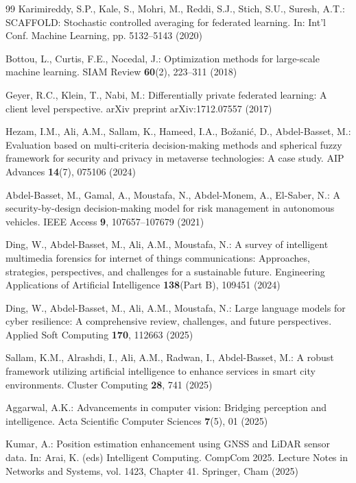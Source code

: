 \documentclass[12pt,a4paper]{article}
\theoremstyle{definition}
\begin{document}
\begin{thebibliography}{99}
Karimireddy, S.P., Kale, S., Mohri, M., Reddi, S.J., Stich, S.U., Suresh, A.T.: SCAFFOLD: Stochastic controlled averaging for federated learning. In: Int'l Conf. Machine Learning, pp. 5132--5143 (2020)

Bottou, L., Curtis, F.E., Nocedal, J.: Optimization methods for large-scale machine learning. SIAM Review \textbf{60}(2), 223--311 (2018)

Geyer, R.C., Klein, T., Nabi, M.: Differentially private federated learning: A client level perspective. arXiv preprint arXiv:1712.07557 (2017)

Hezam, I.M., Ali, A.M., Sallam, K., Hameed, I.A., Bo\v{z}ani\'{c}, D., Abdel-Basset, M.: Evaluation based on multi-criteria decision-making methods and spherical fuzzy framework for security and privacy in metaverse technologies: A case study. AIP Advances \textbf{14}(7), 075106 (2024)

Abdel-Basset, M., Gamal, A., Moustafa, N., Abdel-Monem, A., El-Saber, N.: A security-by-design decision-making model for risk management in autonomous vehicles. IEEE Access \textbf{9}, 107657--107679 (2021)

Ding, W., Abdel-Basset, M., Ali, A.M., Moustafa, N.: A survey of intelligent multimedia forensics for internet of things communications: Approaches, strategies, perspectives, and challenges for a sustainable future. Engineering Applications of Artificial Intelligence \textbf{138}(Part B), 109451 (2024)

Ding, W., Abdel-Basset, M., Ali, A.M., Moustafa, N.: Large language models for cyber resilience: A comprehensive review, challenges, and future perspectives. Applied Soft Computing \textbf{170}, 112663 (2025)

Sallam, K.M., Alrashdi, I., Ali, A.M., Radwan, I., Abdel-Basset, M.: A robust framework utilizing artificial intelligence to enhance services in smart city environments. Cluster Computing \textbf{28}, 741 (2025)

Aggarwal, A.K.: Advancements in computer vision: Bridging perception and intelligence. Acta Scientific Computer Sciences \textbf{7}(5), 01 (2025)

Kumar, A.: Position estimation enhancement using GNSS and LiDAR sensor data. In: Arai, K. (eds) Intelligent Computing. CompCom 2025. Lecture Notes in Networks and Systems, vol. 1423, Chapter 41. Springer, Cham (2025)


\end{thebibliography}
\end{document}
